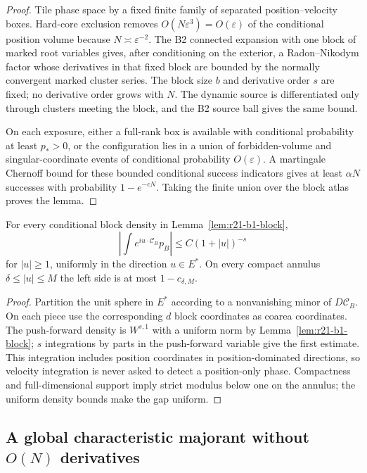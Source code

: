 \begin{proof}
Tile phase space by a fixed finite family of separated position--velocity
boxes.  Hard-core exclusion removes $O(N\varepsilon^3)=O(\varepsilon)$ of the
conditional position volume because $N\asymp\varepsilon^{-2}$.  The B2
connected expansion with one block of marked root variables gives, after
conditioning on the exterior, a Radon--Nikodym factor whose derivatives in
that fixed block are bounded by the normally convergent marked cluster
series.  The block size $b$ and derivative order $s$ are fixed; no derivative
order grows with $N$.  The dynamic source is differentiated only through
clusters meeting the block, and the B2 source ball gives the same bound.

On each exposure, either a full-rank box is available with conditional
probability at least $p_*>0$, or the configuration lies in a union of
forbidden-volume and singular-coordinate events of conditional probability
$O(\varepsilon)$.  A martingale Chernoff bound for these bounded conditional
success indicators gives at least $\alpha N$ successes with probability
$1-e^{-cN}$.  Taking the finite union over the block atlas proves the lemma.
\end{proof}

\begin{lemma}
\label{lem:r21-b1-oneblock}
For every conditional block density in
Lemma~\ref{lem:r21-b1-block},
\[
 \left|\int e^{iu\cdot\mathcal C_B}p_B\right|
 \le C(1+|u|)^{-s}
\]
for $|u|\ge1$, uniformly in the direction $u\in E^*$.  On every compact
annulus $\delta\le|u|\le M$ the left side is at most $1-c_{\delta,M}$.
\end{lemma}

\begin{proof}
Partition the unit sphere in $E^*$ according to a nonvanishing minor of
$D\mathcal C_B$.  On each piece use the corresponding $d$ block coordinates
as coarea coordinates.  The push-forward density is $W^{s,1}$ with a uniform
norm by Lemma~\ref{lem:r21-b1-block}; $s$ integrations by parts in the
push-forward variable give the first estimate.  This integration includes
position coordinates in position-dominated directions, so velocity
integration is never asked to detect a position-only phase.  Compactness and
full-dimensional support imply strict modulus below one on the annulus; the
uniform density bounds make the gap uniform.
\end{proof}

\subsection{A global characteristic majorant without $O(N)$ derivatives}

